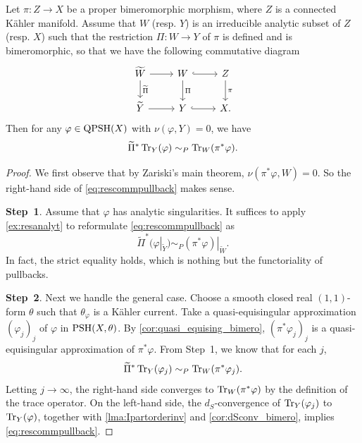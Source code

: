 \begin{lemma}\label{lma:rescommpullback}
    Let $\pi\colon Z\rightarrow X$ be a proper bimeromorphic morphism, where $Z$ is a connected Kähler manifold. Assume that $W$ (resp. $Y$) is an irreducible analytic subset of $Z$ (resp. $X$) such that the restriction $\Pi \colon W\rightarrow Y$ of $\pi$ is defined and is bimeromorphic, so that we have the following commutative diagram
    \[
    \begin{tikzcd}
        \widetilde{W}\arrow[r]\arrow[d,"\widetilde{\Pi}"] & W \arrow[d, "\Pi"] \arrow[r, hook] & Z \arrow[d, "\pi"] \\
        \widetilde{Y}\arrow[r] & Y \arrow[r, hook]                  & X.
\end{tikzcd}
    \]
    Then for any $\varphi\in \mathrm{QPSH}(X)$ with $\nu(\varphi,Y)=0$, we have
\begin{equation}\label{eq:rescommpullback}
    \widetilde{\Pi}^*\operatorname{Tr}_{Y}(\varphi)\sim_P\operatorname{Tr}_W(\pi^*\varphi).
    \end{equation}
\end{lemma}
\begin{proof}
We first observe that by Zariski's main theorem, $\nu(\pi^*\varphi,W)=0$. So the right-hand side of \eqref{eq:rescommpullback} makes sense.

\textbf{Step~1}.
    Assume that $\varphi$ has analytic singularities.
    It suffices to apply \cref{ex:resanalyt} to reformulate \eqref{eq:rescommpullback} as
    \[
    \widetilde{\Pi}^*(\varphi|_{\widetilde{Y}})\sim_P(\pi^*\varphi)|_{\widetilde{W}}.
    \]
    In fact, the strict equality holds, which is nothing but the functoriality of pullbacks.

\textbf{Step~2}.
    Next we handle the general case. Choose a smooth closed real $(1,1)$-form $\theta$ such that $\theta_{\varphi}$ is a Kähler current. Take a quasi-equisingular approximation $(\varphi_j)_j$ of $\varphi$ in $\mathrm{PSH}(X,\theta)$. By \cref{cor:quasi_equising_bimero}, $(\pi^*\varphi_j)_j$ is a quasi-equisingular approximation of $\pi^*\varphi$.
    From Step~1, we know that for each $j$,
    \[
    \widetilde{\Pi}^*\operatorname{Tr}_{Y}(\varphi_j)\sim_P\operatorname{Tr}_W(\pi^*\varphi_j).
    \]
    Letting $j\to\infty$, the right-hand side converges to $\operatorname{Tr}_W(\pi^*\varphi)$ by the definition of the trace operator. On the left-hand side, the $d_S$-convergence of $\operatorname{Tr}_Y(\varphi_j)$ to $\operatorname{Tr}_Y(\varphi)$, together with \cref{lma:Ipartorderinv} and \cref{cor:dSconv_bimero}, implies \eqref{eq:rescommpullback}.
\end{proof}


